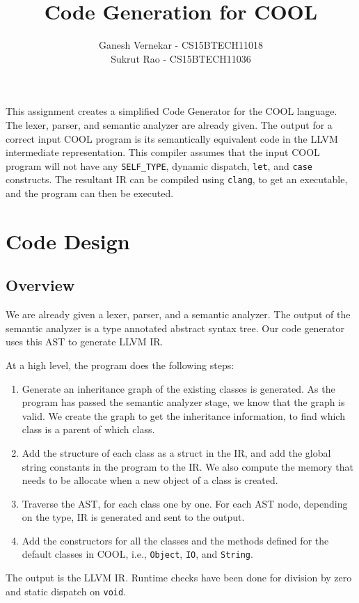 \documentclass{article}
\title{Code Generation for COOL}
\author{Ganesh Vernekar - CS15BTECH11018 \\ Sukrut Rao - CS15BTECH11036}
\begin{document}
	\maketitle
	
This assignment creates a simplified Code Generator for the COOL language. The lexer, parser, and semantic analyzer are already given. The output for a correct input COOL program is its semantically equivalent code in the LLVM intermediate representation. This compiler assumes that the input COOL program will not have any \verb|SELF_TYPE|, dynamic dispatch, \verb|let|, and \verb|case| constructs. The resultant IR can be compiled using \verb|clang|, to get an executable, and the program can then be executed.
	
\section{Code Design}
\subsection{Overview}
We are already given a lexer, parser, and a semantic analyzer. The output of the semantic analyzer is a type annotated abstract syntax tree. Our code generator uses this AST to generate LLVM IR.
	
At a high level, the program does the following steps:
\begin{enumerate}
	\item Generate an inheritance graph of the existing classes is generated. As the program has passed the semantic analyzer stage, we know that the graph is valid. We create the graph to get the inheritance information, to find which class is a parent of which class.
	\item Add the structure of each class as a struct in the IR, and add the global string constants in the program to the IR. We also compute the memory that needs to be allocate when a new object of a class is created.
	\item Traverse the AST, for each class one by one. For each AST node, depending on the type, IR is generated and sent to the output.
	\item Add the constructors for all the classes and the methods defined for the default classes in COOL, i.e., \verb|Object|, \verb|IO|, and \verb|String|.
\end{enumerate}
The output is the LLVM IR. Runtime checks have been done for division by zero and static dispatch on \verb|void|.
\end{document}
